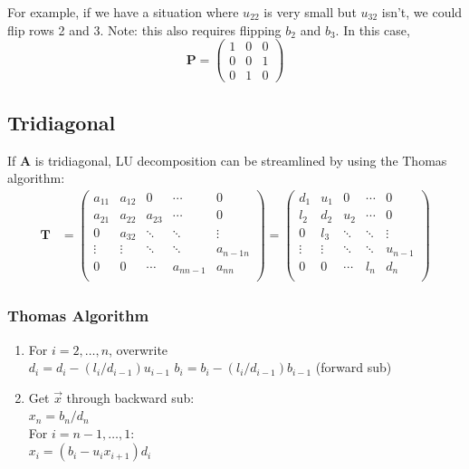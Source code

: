 \documentclass[12pt]{article}
\newcommand{\ve}[1]{\ensuremath{\mathbf{#1}}}
\begin{document}
For example, if we have a situation where $u_{22}$ is very small but $u_{32}$ isn't, we could flip rows 2 and 3. Note: this also requires flipping $b_2$ and $b_3$. In this case, 
\[\ve{P} = \begin{pmatrix}
  1 & 0 & 0 \\
  0 & 0 & 1 \\
  0 & 1 & 0
\end{pmatrix} \]

\subsection{Tridiagonal}
If $\ve{A}$ is tridiagonal, LU decomposition can be streamlined by using the Thomas algorithm:
%
\begin{align}
    \ve{T} &= \begin{pmatrix}
      a_{11} & a_{12} & 0      & \cdots    & 0 \\
      a_{21} & a_{22} & a_{23} & \cdots    & 0 \\
      0      & a_{32} & \ddots & \ddots    & \vdots \\     
      \vdots & \vdots & \ddots & \ddots    & a_{n-1 n}\\
      0      & 0      & \cdots & a_{n n-1} & a_{nn} \\
    \end{pmatrix} =
    \begin{pmatrix}
      d_{1}  & u_{1}  & 0      & \cdots & 0 \\
      l_{2}  & d_{2}  & u_{2}  & \cdots & 0 \\
      0      & l_{3}  & \ddots & \ddots & \vdots \\     
      \vdots & \vdots & \ddots & \ddots & u_{n-1}\\
      0      & 0      & \cdots & l_{n}  & d_{n} \\
    \end{pmatrix} \nonumber   
\end{align} 

\subsubsection{Thomas Algorithm}
\begin{enumerate}
\item For $i=2, \dots, n$, overwrite\\
  \hspace*{1 em} $d_i = d_i - (l_i / d_{i-1}) u_{i-1}$
  \hspace*{1 em} $b_i = b_i - (l_i / d_{i-1}) b_{i-1}$ (forward sub)

\item Get $\vec{x}$ through backward sub:\\
$x_n = b_n / d_n$\\
For $i = n-1, \dots, 1$:\\
  \hspace*{1 em} $x_i = (b_i - u_i x_{i+1}) d_i$
\end{enumerate}
\end{document}
